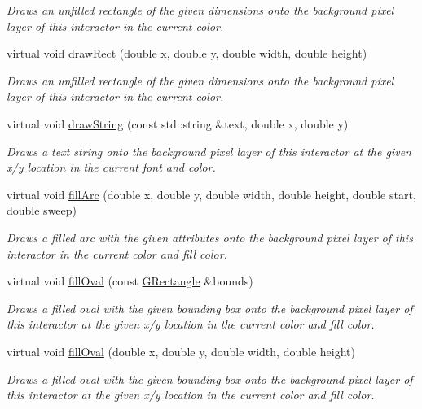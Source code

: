 \begin{DoxyCompactItemize}
\begin{DoxyCompactList}\small\item\em Draws an unfilled rectangle of the given dimensions onto the background pixel layer of this interactor in the current color. \end{DoxyCompactList}\item 
virtual void \mbox{\hyperlink{classGDrawingSurface_a4148e770ffc5474153aadd4814dbd708}{draw\+Rect}} (double x, double y, double width, double height)
\begin{DoxyCompactList}\small\item\em Draws an unfilled rectangle of the given dimensions onto the background pixel layer of this interactor in the current color. \end{DoxyCompactList}\item 
virtual void \mbox{\hyperlink{classGDrawingSurface_ad4e8551a753a77135792bbee97013675}{draw\+String}} (const std\+::string \&text, double x, double y)
\begin{DoxyCompactList}\small\item\em Draws a text string onto the background pixel layer of this interactor at the given x/y location in the current font and color. \end{DoxyCompactList}\item 
virtual void \mbox{\hyperlink{classGDrawingSurface_a228075ad18bd97b57f9956568c4773f3}{fill\+Arc}} (double x, double y, double width, double height, double start, double sweep)
\begin{DoxyCompactList}\small\item\em Draws a filled arc with the given attributes onto the background pixel layer of this interactor in the current color and fill color. \end{DoxyCompactList}\item 
virtual void \mbox{\hyperlink{classGDrawingSurface_a1ea6e48d59fb588797dba4deab1397e0}{fill\+Oval}} (const \mbox{\hyperlink{structGRectangle}{G\+Rectangle}} \&bounds)
\begin{DoxyCompactList}\small\item\em Draws a filled oval with the given bounding box onto the background pixel layer of this interactor at the given x/y location in the current color and fill color. \end{DoxyCompactList}\item 
virtual void \mbox{\hyperlink{classGDrawingSurface_a28c700c82f31cd328a4629273420ee61}{fill\+Oval}} (double x, double y, double width, double height)
\begin{DoxyCompactList}\small\item\em Draws a filled oval with the given bounding box onto the background pixel layer of this interactor at the given x/y location in the current color and fill color. \end{DoxyCompactList}\item 

\end{DoxyCompactItemize}
